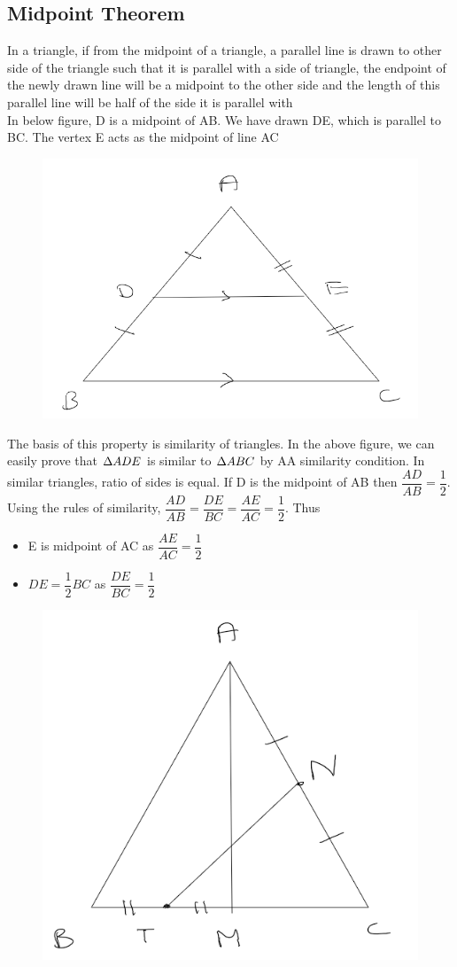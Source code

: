 \subsection{Midpoint Theorem}
In a triangle, if from the midpoint of a triangle, a parallel line is drawn to other side of the triangle such that it is parallel with a side of triangle, the endpoint of the newly drawn line will be a midpoint to the other side and the length of this parallel line will be half of the side it is parallel with \\

In below figure, D is a midpoint of AB. We have drawn DE, which is parallel to BC. The vertex E acts as the midpoint of line AC

\begin{figure}[h!]
    \centering
    \includegraphics[width=0.5\linewidth]{Quant//Geometry//Images//Triangles/triangle_12_midpoint_theorem_result.png}
\end{figure}

The basis of this property is similarity of triangles. In the above figure, we can easily prove that $\Delta {ADE}$ is similar to $\Delta {ABC}$ by AA similarity condition. In similar triangles, ratio of sides is equal. If D is the midpoint of AB then $\dfrac{AD}{AB} = \dfrac{1}{2}$. Using the rules of similarity, $\dfrac{AD}{AB} = \dfrac{DE}{BC} = \dfrac{AE}{AC} = \dfrac{1}{2}$. Thus
\begin{itemize}
    \item E is midpoint of AC as $\dfrac{AE}{AC} = \dfrac{1}{2}$
    \item $DE = \dfrac{1}{2} BC$ as $\dfrac{DE}{BC} = \dfrac{1}{2}$
\end{itemize}


\begin{figure}[h!]
    \centering
    \includegraphics[width=0.35\linewidth]{Quant//Geometry//Images//Triangles/triangle_12_midpt_question_1.png}
\end{figure}

